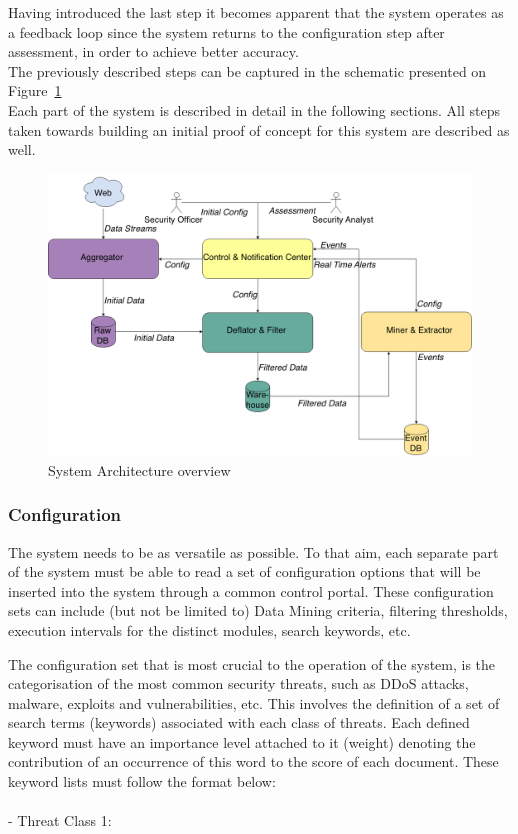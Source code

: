 \documentclass[12pt]{article}
\newcounter{subsubsubsection}[subsubsection]
\begin{document}
Having introduced the last step it becomes apparent that the system operates as a feedback loop since the system returns to the configuration step after assessment, in order to achieve better accuracy. 
\hfill \break \\ 
The previously described steps can be captured in the schematic presented on Figure~\ref{fig:arch}
\hfill \break \\ 
Each part of the system is described in detail in the following sections. All steps taken towards building an initial proof of concept for this system are described as well. 

\begin{figure}[h]
    \centering
   \includegraphics[scale=0.33]{./images/Architecture.png}
    \caption{System Architecture overview}
    \label{fig:arch}
\end{figure}	

\newpage
\subsubsection{Configuration}
The system needs to be as versatile as possible. To that aim, each separate part of the system must be able to read a set of configuration options that will be inserted into the system through a common control portal. These configuration sets can include (but not be limited to) Data Mining criteria, filtering thresholds, execution intervals for the distinct modules, search keywords, etc. 


The configuration set that is most crucial to the operation of the system, is the categorisation of the most common security threats, such as DDoS attacks, malware, exploits and vulnerabilities, etc. This involves the definition of a set of search terms (keywords) associated with each class of threats. Each defined keyword must have an importance level attached to it (weight) denoting the contribution of an occurrence of this word to the score of each document. These keyword lists must follow the format below:\\\\
- Threat Class 1:
\end{document}
